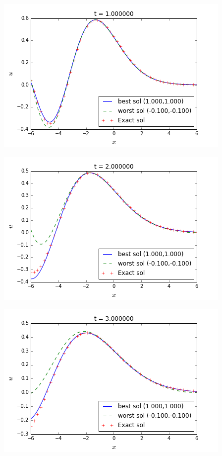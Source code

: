 \begingroup
\noindent
\begin{minipage}{.5\linewidth}
\includegraphics[scale=.5]{figures/BessefirstTestsP0Snap2.png}
\end{minipage}
\begin{minipage}{.5\linewidth}
	\includegraphics[scale=.5]{figures/BessefirstTestsP0Snap3.png}
\end{minipage}
\begin{minipage}{.5\linewidth}
\includegraphics[scale=.5]{figures/BessefirstTestsP0Snap4.png}
\end{minipage}

